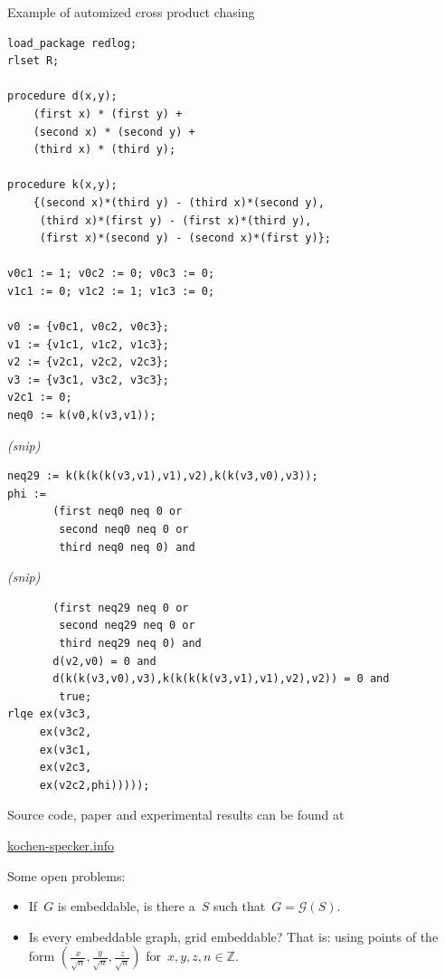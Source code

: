 \documentclass{beamer}
\begin{document}
\begin{frame}[fragile]{Example of automized cross product chasing}
    \fontsize{2}{1}
\begin{verbatim}
load_package redlog;
rlset R;

procedure d(x,y);
    (first x) * (first y) +
    (second x) * (second y) +
    (third x) * (third y);

procedure k(x,y);
    {(second x)*(third y) - (third x)*(second y),
     (third x)*(first y) - (first x)*(third y),
     (first x)*(second y) - (second x)*(first y)};

v0c1 := 1; v0c2 := 0; v0c3 := 0;
v1c1 := 0; v1c2 := 1; v1c3 := 0;

v0 := {v0c1, v0c2, v0c3}; 
v1 := {v1c1, v1c2, v1c3}; 
v2 := {v2c1, v2c2, v2c3}; 
v3 := {v3c1, v3c2, v3c3}; 
v2c1 := 0;
neq0 := k(v0,k(v3,v1)); 
\end{verbatim}
\begin{center} \emph{(snip)} \end{center}
\begin{verbatim}
neq29 := k(k(k(k(v3,v1),v1),v2),k(k(v3,v0),v3)); 
phi := 
       (first neq0 neq 0 or
        second neq0 neq 0 or
        third neq0 neq 0) and 
\end{verbatim}
\begin{center} \emph{(snip)} \end{center}
\begin{verbatim}
       (first neq29 neq 0 or
        second neq29 neq 0 or
        third neq29 neq 0) and 
       d(v2,v0) = 0 and 
       d(k(k(v3,v0),v3),k(k(k(k(v3,v1),v1),v2),v2)) = 0 and 
        true;
rlqe ex(v3c3,
     ex(v3c2,
     ex(v3c1,
     ex(v2c3,
     ex(v2c2,phi)))));
\end{verbatim}
\end{frame}

\begin{frame}
    Source code, paper and experimental results can be found at
    \begin{center}
        \url{kochen-specker.info}
    \end{center}
    \pause
    Some open problems:
    \begin{itemize}
        \item
            If~$G$ is embeddable,
            is there a~$S$ such that~$G = \mathcal{G}(S)$.
        \item
            Is every embeddable graph,
            grid embeddable? That is: using points of the form
            $(\frac{x}{\sqrt{n}}, \frac{y}{\sqrt{n}}, \frac{z}{\sqrt{n}})$
            for~$x,y,z,n \in \mathbb{Z}$.
    \end{itemize}
\end{frame}
\end{document}
